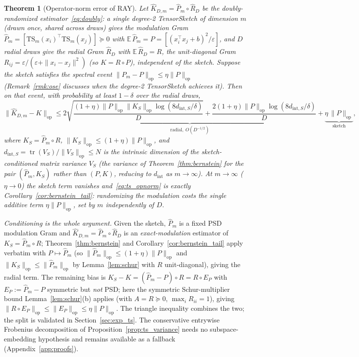 \documentclass{article}
\newtheorem{theorem}{Theorem}[section]
\begin{document}
\begin{theorem}[Operator-norm error of RAY]\label{thm:ts_opnorm}
Let $\widehat K_{D,m}=\widehat P_m\circ\widehat R_D$ be the doubly-randomized estimator~\eqref{eq:doubly}: a single degree-2 TensorSketch of dimension $m$ (drawn once, shared across draws) gives the modulation Gram $\widehat P_m=[\mathrm{TS}_m(x_i)^\top\mathrm{TS}_m(x_j)]\succeq0$ with $\mathbb{E}\,\widehat P_m=P=[(x_i^\top x_j+b)^2/\varepsilon]$, and $D$ radial draws give the radial Gram $\widehat R_D$ with $\mathbb{E}\,\widehat R_D=R$, the unit-diagonal Gram $R_{ij}=\varepsilon/(\varepsilon+\|x_i-x_j\|^2)$ (so $K=R\circ P$), independent of the sketch. Suppose the sketch satisfies the spectral event $\|\widehat P_m-P\|_{\mathrm{op}}\le\eta\|P\|_{\mathrm{op}}$ (Remark~\ref{rmk:ose} discusses when the degree-2 TensorSketch achieves it). Then on that event, with probability at least $1-\delta$ over the radial draws,
\begin{equation}\label{eq:ts_opnorm}
\|\widehat K_{D,m}-K\|_{\mathrm{op}}\le \underbrace{2\sqrt{\frac{(1+\eta)\|P\|_{\mathrm{op}}\|K_S\|_{\mathrm{op}}\log(8d_{\mathrm{int},S}/\delta)}{D}}+\frac{2(1+\eta)\|P\|_{\mathrm{op}}\log(8d_{\mathrm{int},S}/\delta)}{D}}_{\text{radial},\ O(D^{-1/2})}+\underbrace{\eta\,\|P\|_{\mathrm{op}}}_{\text{sketch}},
\end{equation}
where $K_S=\widehat P_m\circ R$, $\|K_S\|_{\mathrm{op}}\le(1+\eta)\|P\|_{\mathrm{op}}$, and $d_{\mathrm{int},S}=\operatorname{tr}(V_S)/\|V_S\|_{\mathrm{op}}\le N$ is the intrinsic dimension of the \emph{sketch-conditioned} matrix variance $V_S$ (the variance of Theorem~\ref{thm:bernstein} for the pair $(\widehat P_m,K_S)$ rather than $(P,K)$, reducing to $d_{\mathrm{int}}$ as $m\to\infty$). At $m\to\infty$ ($\eta\to0$) the sketch term vanishes and~\eqref{eq:ts_opnorm} is exactly Corollary~\ref{cor:bernstein_tail}: randomizing the modulation costs the single additive term $\eta\|P\|_{\mathrm{op}}$, set by $m$ independently of $D$.
\end{theorem}
\noindent \emph{Conditioning is the whole argument.} Given the sketch, $\widehat P_m$ is a fixed PSD modulation Gram and $\widehat K_{D,m}=\widehat P_m\circ\widehat R_D$ is an \emph{exact-modulation} estimator of $K_S=\widehat P_m\circ R$; Theorem~\ref{thm:bernstein} and Corollary~\ref{cor:bernstein_tail} apply verbatim with $P\mapsto\widehat P_m$ (so $\|\widehat P_m\|_{\mathrm{op}}\le(1+\eta)\|P\|_{\mathrm{op}}$ and $\|K_S\|_{\mathrm{op}}\le\|\widehat P_m\|_{\mathrm{op}}$ by Lemma~\ref{lem:schur} with $R$ unit-diagonal), giving the radial term. The remaining bias is $K_S-K=(\widehat P_m-P)\circ R=R\circ E_P$ with $E_P:=\widehat P_m-P$ symmetric but \emph{not} PSD; here the symmetric Schur-multiplier bound Lemma~\ref{lem:schur}(b) applies (with $A=R\succeq0$, $\max_i R_{ii}=1$), giving $\|R\circ E_P\|_{\mathrm{op}}\le\|E_P\|_{\mathrm{op}}\le\eta\|P\|_{\mathrm{op}}$. The triangle inequality combines the two; the split is validated in Section~\ref{sec:exp_ts}. The conservative entrywise Frobenius decomposition of Proposition~\ref{prop:ts_variance} needs no subspace-embedding hypothesis and remains available as a fallback (Appendix~\ref{app:proofs}).
\end{document}
